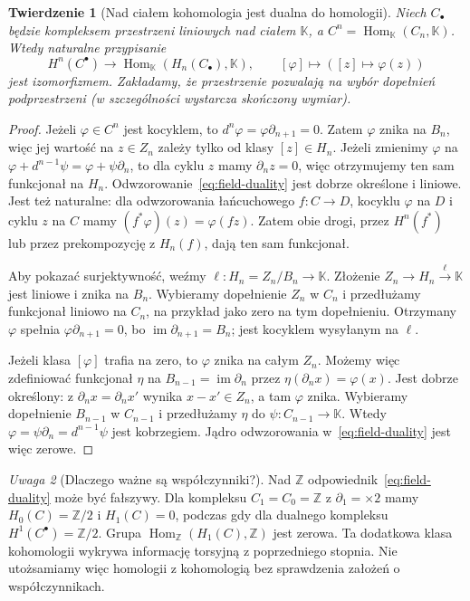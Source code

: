 \documentclass[11pt,a4paper,oneside]{report}
\newcommand{\Z}{\mathbb{Z}}
\theoremstyle{plain}
\newtheorem{twierdzenie}{Twierdzenie}[section]
\theoremstyle{definition}
\theoremstyle{remark}
\newtheorem{uwaga}[twierdzenie]{Uwaga}
\begin{document}
\begin{twierdzenie}[Nad ciałem kohomologia jest dualna do homologii]
\label{thm:field-hom-dual}
Niech $C_\bullet$ będzie kompleksem
przestrzeni liniowych nad ciałem
$\mathbb K$, a
$C^n=\operatorname{Hom}_{\mathbb K}(C_n,\mathbb K)$.
Wtedy naturalne przypisanie
\begin{equation}\label{eq:field-duality}
 H^n(C^\bullet)
 \longrightarrow\operatorname{Hom}_{\mathbb K}
  (H_n(C_\bullet),\mathbb K),
 \qquad [\varphi]\longmapsto
     ([z]\longmapsto\varphi(z))
\end{equation}
jest izomorfizmem. Zakładamy, że
przestrzenie pozwalają na wybór
dopełnień podprzestrzeni
(w szczególności wystarcza skończony wymiar).
\end{twierdzenie}
\begin{proof}
Jeżeli $\varphi\in C^n$ jest kocyklem,
to $d^n\varphi=\varphi \partial_{n+1}=0$.
Zatem $\varphi$ znika na $B_n$,
więc jej wartość na $z\in Z_n$
zależy tylko od klasy $[z]\in H_n$.
Jeżeli zmienimy $\varphi$ na
$\varphi+d^{n-1}\psi
=\varphi+\psi \partial_n$, to dla cyklu $z$
mamy $\partial_nz=0$, więc otrzymujemy
ten sam funkcjonał na $H_n$.
Odwzorowanie~\eqref{eq:field-duality} jest
dobrze określone i liniowe. Jest też naturalne: dla odwzorowania
łańcuchowego $f:C\to D$, kocyklu $\varphi$ na $D$ i cyklu $z$ na $C$
mamy $(f^*\varphi)(z)=\varphi(fz)$. Zatem obie drogi, przez
$H^n(f^*)$ lub przez prekompozycję z $H_n(f)$, dają ten sam funkcjonał.

Aby pokazać surjektywność, weźmy
$\ell:H_n=Z_n/B_n\to\mathbb K$.
Złożenie $Z_n\to H_n\xrightarrow{\ell}\mathbb K$
jest liniowe i znika na $B_n$.
Wybieramy dopełnienie $Z_n$ w $C_n$
i przedłużamy funkcjonał liniowo
na $C_n$, na przykład jako zero
na tym dopełnieniu. Otrzymany
$\varphi$ spełnia
$\varphi \partial_{n+1}=0$, bo
$\operatorname{im}\partial_{n+1}=B_n$;
jest kocyklem wysyłanym na $\ell$.

Jeżeli klasa $[\varphi]$ trafia na zero,
to $\varphi$ znika na całym $Z_n$.
Możemy więc zdefiniować funkcjonał
$\eta$ na $B_{n-1}=\operatorname{im}\partial_n$
przez $\eta(\partial_nx)=\varphi(x)$.
Jest dobrze określony: z
$\partial_nx=\partial_nx'$ wynika $x-x'\in Z_n$,
a tam $\varphi$ znika.
Wybieramy dopełnienie $B_{n-1}$
w $C_{n-1}$ i przedłużamy $\eta$
do $\psi:C_{n-1}\to\mathbb K$.
Wtedy $\varphi=\psi \partial_n=d^{n-1}\psi$
jest kobrzegiem. Jądro odwzorowania
w~\eqref{eq:field-duality} jest więc zerowe.
\end{proof}

\begin{uwaga}[Dlaczego ważne są współczynniki?]
Nad $\Z$ odpowiednik~\eqref{eq:field-duality}
może być fałszywy. Dla kompleksu
$C_1=C_0=\Z$ z $\partial_1=\times2$ mamy
$H_0(C)=\Z/2$ i $H_1(C)=0$,
podczas gdy dla dualnego kompleksu
$H^1(C^\bullet)=\Z/2$.
Grupa $\operatorname{Hom}_{\Z}
(H_1(C),\Z)$ jest zerowa.
Ta dodatkowa klasa kohomologii
wykrywa informację torsyjną z
poprzedniego stopnia. Nie utożsamiamy
więc homologii z kohomologią bez
sprawdzenia założeń o współczynnikach.
\end{uwaga}
\end{document}

